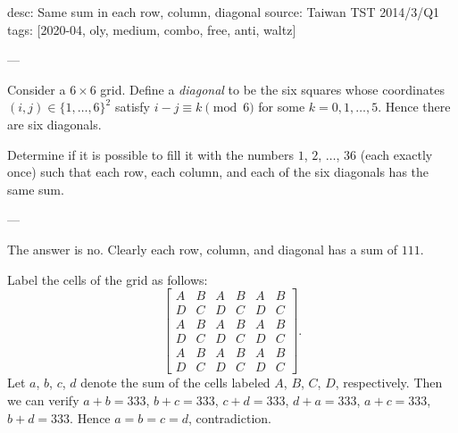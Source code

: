 desc: Same sum in each row, column, diagonal
source: Taiwan TST 2014/3/Q1
tags: [2020-04, oly, medium, combo, free, anti, waltz]

---

Consider a $6\times6$ grid. Define a \emph{diagonal} to be the six squares whose coordinates $(i,j)\in\{1,\ldots,6\}^2$ satisfy $i-j\equiv k\pmod6$ for some $k=0,1,\ldots,5$. Hence there are six diagonals.

Determine if it is possible to fill it with the numbers $1$, $2$, $\ldots$, $36$ (each exactly once) such that each row, each column, and each of the six diagonals has the same sum.

---

The answer is no. Clearly each row, column, and diagonal has a sum of $111$.

Label the cells of the grid as follows: \[\begin{bmatrix}
    A&B&A&B&A&B\\
    D&C&D&C&D&C\\
    A&B&A&B&A&B\\
    D&C&D&C&D&C\\
    A&B&A&B&A&B\\
    D&C&D&C&D&C
\end{bmatrix}.\]
Let $a$, $b$, $c$, $d$ denote the sum of the cells labeled $A$, $B$, $C$, $D$, respectively. Then we can verify $a+b=333$, $b+c=333$, $c+d=333$, $d+a=333$, $a+c=333$, $b+d=333$. Hence $a=b=c=d$, contradiction.
